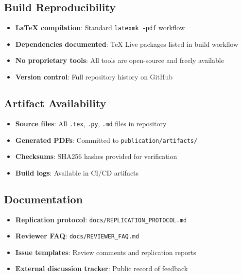 \subsection*{Build Reproducibility}

\begin{itemize}
\item[\checkmark] \textbf{LaTeX compilation}: Standard \texttt{latexmk -pdf} workflow
\item[\checkmark] \textbf{Dependencies documented}: TeX Live packages listed in build workflow
\item[\checkmark] \textbf{No proprietary tools}: All tools are open-source and freely available
\item[\checkmark] \textbf{Version control}: Full repository history on GitHub
\end{itemize}

\subsection*{Artifact Availability}

\begin{itemize}
\item[\checkmark] \textbf{Source files}: All \texttt{.tex}, \texttt{.py}, \texttt{.md} files in repository
\item[\checkmark] \textbf{Generated PDFs}: Committed to \texttt{publication/artifacts/}
\item[\checkmark] \textbf{Checksums}: SHA256 hashes provided for verification
\item[\checkmark] \textbf{Build logs}: Available in CI/CD artifacts
\end{itemize}

\subsection*{Documentation}

\begin{itemize}
\item[\checkmark] \textbf{Replication protocol}: \texttt{docs/REPLICATION\_PROTOCOL.md}
\item[\checkmark] \textbf{Reviewer FAQ}: \texttt{docs/REVIEWER\_FAQ.md}
\item[\checkmark] \textbf{Issue templates}: Review comments and replication reports
\item[\checkmark] \textbf{External discussion tracker}: Public record of feedback
\end{itemize}

